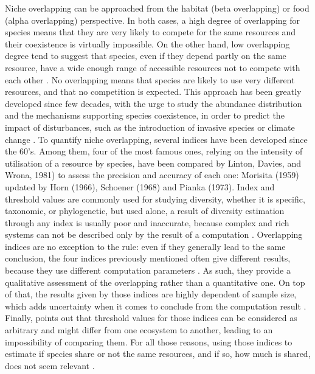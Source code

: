 Niche overlapping can be approached from the habitat (beta overlapping) or food (alpha overlapping) perspective. In both cases, a high degree of overlapping for species means that they are very likely to compete for the same resources and their coexistence is virtually impossible. On the other hand, low overlapping degree tend to suggest that species, even if they depend partly on the same resource, have a wide enough range of accessible resources not to compete with each other \citep{mouillot2005}. No overlapping means that species are likely to use very different resources, and that no competition is expected. This approach has been greatly developed since few decades, with the urge to study the abundance distribution and the mechanisms supporting species coexistence, in order to predict the impact of disturbances, such as the introduction of invasive species or climate change \citep{albouy2011,geange2011, martini2020}. To quantify niche overlapping, several indices have been developed since the 60’s. Among them, four of the most famous ones, relying on the intensity of utilisation of a resource by species, have been compared by Linton, Davies, and Wrona, 1981) to assess the precision and accuracy of each one: Morisita (1959) updated by Horn (1966), Schoener (1968) and Pianka (1973). Index and threshold values are commonly used for studying diversity, whether it is specific, taxonomic, or phylogenetic, but used alone, a result of diversity estimation through any index is usually poor and inaccurate, because complex and rich systems can not be described only by the result of a computation \citep{mejri2009}. Overlapping indices are no exception to the rule: even if they generally lead to the same conclusion, the four indices previously mentioned often give different results, because they use different computation parameters \citep{blondel1979}. As such, they provide a qualitative assessment of the overlapping rather than a quantitative one. On top of that, the results given by those indices are highly dependent of sample size, which adds uncertainty when it comes to conclude from the computation result \citep{linton1981}. Finally, \citep{grossman2009} points out that threshold values for those indices can be considered as arbitrary and might differ from one ecosystem to another, leading to an impossibility of comparing them. For all those reasons, using those indices to estimate if species share or not the same resources, and if so, how much is shared, does not seem relevant \citep{mouillot2005}. 
